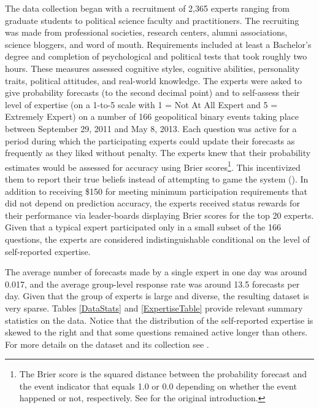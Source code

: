\documentclass[aoas, preprint]{imsart}
\numberwithin{equation}{section}
\theoremstyle{plain}
\begin{document}
The data collection began with a recruitment of 2,365 experts ranging from graduate students to political science faculty and practitioners. The recruiting was made from professional societies, research centers, alumni associations, science bloggers, and word of mouth. Requirements included at least a Bachelor's degree and completion of psychological and political tests that took roughly two hours. These measures assessed cognitive styles, cognitive abilities, personality traits, political attitudes, and real-world knowledge. The experts were asked to give probability forecasts (to the second decimal point) and to self-assess their level of expertise (on a 1-to-5 scale with 1 = Not At All Expert and 5 = Extremely Expert) on a number of 166 geopolitical binary events taking place between September 29, 2011 and May 8, 2013. Each question was active for a period during which the participating experts could update their forecasts as frequently as they liked without penalty. The experts knew that their probability estimates would be assessed for accuracy using Brier scores\footnote{The Brier score is the squared distance between the probability forecast and the event indicator that equals 1.0 or 0.0 depending on whether the event happened or not, respectively. See \citet{Brier} for the original introduction.}. This incentivized them to report their true beliefs instead of attempting to game the system (\citet{winkler1968good}). In addition to receiving \$150 for meeting minimum participation requirements that did not depend on prediction accuracy, the experts received status rewards for their performance via leader-boards displaying Brier scores for the top 20 experts. Given that a typical expert participated only in a small subset of the 166 questions, the experts are considered indistinguishable conditional on the level of self-reported expertise.


The average number of forecasts made by a single expert in one day was around 0.017, and the average group-level response rate was around 13.5 forecasts per day. Given that the group of experts is large and diverse, the resulting dataset is very sparse. Tables \ref{DataStats} and \ref{ExpertiseTable} provide relevant summary statistics on the data. Notice that the distribution of the self-reported expertise is skewed to the right and that some questions remained active longer than others.  For more details on the dataset and its collection see \citet{ungar2012good}.
\end{document}
